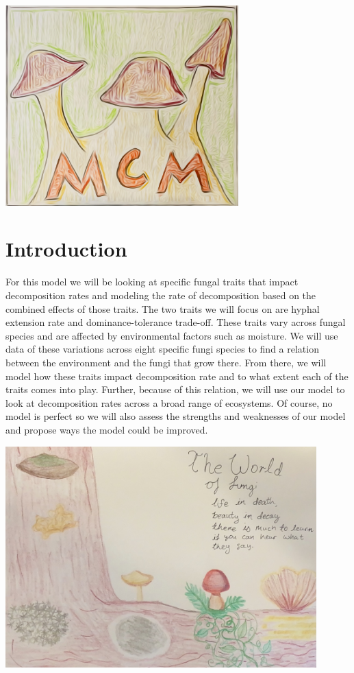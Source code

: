 \documentclass[12pt]{article}
\begin{document}
\begin{center}
\includegraphics[width=9cm]{MCMushroom.JPEG}
\end{center}

\newpage
\tableofcontents
\newpage

\section{Introduction}

For this model we will be looking at specific fungal traits that impact decomposition rates and modeling the rate of decomposition based on the combined effects of those traits. The two traits we will focus on are hyphal extension rate and dominance-tolerance trade-off. These traits vary across fungal species and are affected by environmental factors such as moisture. We will use data of these variations across eight specific fungi species to find a relation between the environment and the fungi that grow there. From there, we will model how these traits impact decomposition rate and to what extent each of the traits comes into play. Further, because of this relation, we will use our model to look at decomposition rates across a broad range of ecosystems. Of course, no model is perfect so we will also assess the strengths and weaknesses of our model and propose ways the model could be improved.

\begin{center}
\includegraphics[width=12cm]{sophiaMCM.jpg}
\end{center}
\end{document}
